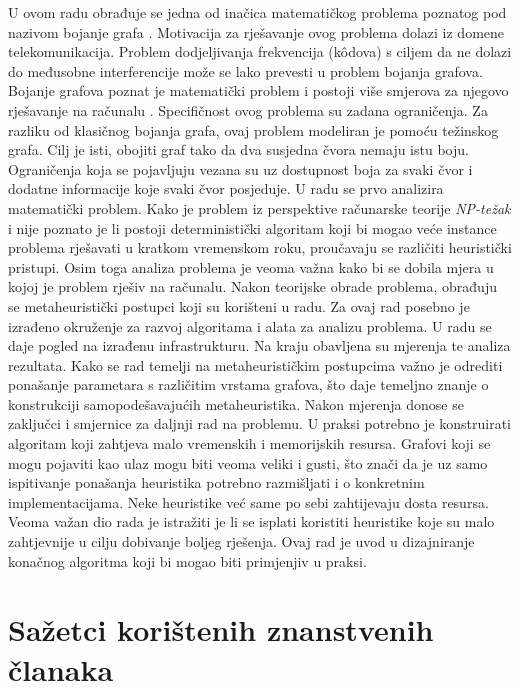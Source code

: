 \documentclass[times, utf8, diplomski, numeric]{fer}
\begin{document}
U ovom radu obrađuje se jedna od inačica matematičkog problema poznatog pod nazivom bojanje grafa . Motivacija za rješavanje ovog problema dolazi iz domene telekomunikacija. Problem dodjeljivanja frekvencija (k\^{o}dova) s ciljem da ne dolazi do međusobne interferencije može se lako prevesti u problem bojanja grafova. Bojanje grafova poznat je matematički problem i postoji više smjerova za njegovo rješavanje na računalu \cite{lit8}. Specifičnost ovog problema su zadana ograničenja. Za razliku od klasičnog bojanja grafa, ovaj problem modeliran je pomoću težinskog grafa. Cilj je isti, obojiti graf tako da dva susjedna čvora nemaju istu boju. Ograničenja koja se pojavljuju vezana su uz dostupnost boja za svaki čvor i dodatne informacije koje svaki čvor posjeduje. U radu se prvo analizira matematički problem. Kako je problem iz perspektive računarske teorije \emph{NP-težak} i nije poznato je li postoji deterministički algoritam koji bi mogao veće instance problema rješavati u kratkom vremenskom roku, proučavaju se različiti heuristički pristupi. Osim toga analiza problema je veoma važna kako bi se dobila mjera u kojoj je problem rješiv na računalu. Nakon teorijske obrade problema, obrađuju se metaheuristički postupci koji su korišteni u radu. Za ovaj rad posebno je izrađeno okruženje za razvoj algoritama i alata za analizu problema. U radu se daje pogled na izrađenu infrastrukturu. Na kraju obavljena su mjerenja te analiza rezultata. Kako se rad temelji na metaheurističkim postupcima važno je odrediti ponašanje parametara s različitim vrstama grafova, što daje temeljno znanje o konstrukciji samopodešavajućih metaheuristika. Nakon mjerenja donose se zaključci i smjernice za daljnji rad na problemu.
U praksi potrebno je konstruirati algoritam koji zahtjeva malo vremenskih i memorijskih resursa. Grafovi koji se mogu pojaviti kao ulaz mogu biti veoma veliki i gusti, što znači da je uz samo ispitivanje ponašanja heuristika potrebno razmišljati i o konkretnim implementacijama. Neke heuristike već same po sebi zahtijevaju dosta resursa. Veoma važan dio rada je istražiti je li se isplati koristiti heuristike koje su malo zahtjevnije u cilju dobivanje boljeg rješenja. Ovaj rad je uvod u dizajniranje konačnog algoritma koji bi mogao biti primjenjiv u praksi.

\section{Sažetci korištenih znanstvenih članaka}
\end{document}
